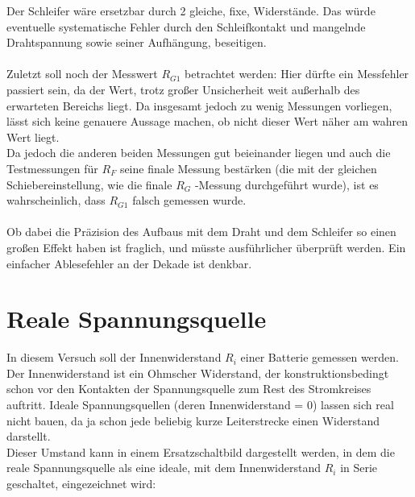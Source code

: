 \documentclass[12pt,a4paper]{article}
\begin{document}
\begin{multicols}{2}
Der Schleifer wäre ersetzbar durch 2 gleiche, fixe, Widerstände. Das würde eventuelle systematische Fehler durch den Schleifkontakt und mangelnde Drahtspannung sowie seiner Aufhängung, beseitigen.\\
\\
Zuletzt soll noch der Messwert $R_{G1}$ betrachtet werden: Hier dürfte ein Messfehler passiert sein, da der Wert, trotz großer Unsicherheit weit außerhalb des erwarteten Bereichs liegt. Da insgesamt jedoch zu wenig Messungen vorliegen, lässt sich keine genauere Aussage machen, ob nicht dieser Wert näher am wahren Wert liegt.\\
Da jedoch die anderen beiden Messungen gut beieinander liegen und auch die Testmessungen für $R_F$ seine finale Messung bestärken (die mit der gleichen Schiebereinstellung, wie die finale $R_G$
-Messung durchgeführt wurde), ist es wahrscheinlich, dass $R_{G1}$ falsch gemessen wurde.\\
\\
Ob dabei die Präzision des Aufbaus mit dem Draht und dem Schleifer so einen großen Effekt haben ist fraglich, und müsste ausführlicher überprüft werden. Ein einfacher Ablesefehler an der Dekade ist denkbar.

\section{Reale Spannungsquelle}
In diesem Versuch soll der Innenwiderstand $R_i$ einer Batterie gemessen werden.\\
Der Innenwiderstand ist ein Ohmscher Widerstand, der konstruktionsbedingt schon vor den Kontakten der Spannungsquelle zum Rest des Stromkreises auftritt. Ideale Spannungsquellen (deren Innenwiderstand = 0) lassen sich real nicht bauen, da ja schon jede beliebig kurze Leiterstrecke einen Widerstand darstellt.\\
Dieser Umstand kann in einem Ersatzschaltbild dargestellt werden, in dem die reale Spannungsquelle als eine ideale, mit dem Innenwiderstand $R_i$ in Serie geschaltet, eingezeichnet wird:




\end{multicols}
\end{document}
